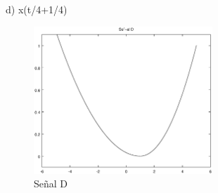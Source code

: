 \documentclass[10pt,a4paper]{report}
\begin{document}
d) x(t/4+1/4)\\

\begin{figure}[H]
\centering
\includegraphics[width=0.6\textwidth]{SignalD}
\caption{Señal D}
\label{fig:SignalD}
\end{figure}
\end{document}
